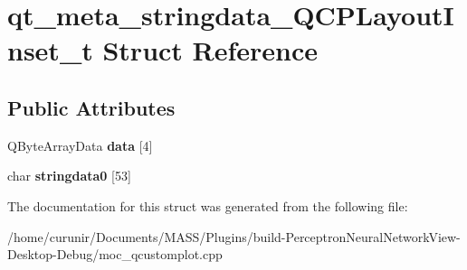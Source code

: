 \hypertarget{structqt__meta__stringdata___q_c_p_layout_inset__t}{}\section{qt\+\_\+meta\+\_\+stringdata\+\_\+\+Q\+C\+P\+Layout\+Inset\+\_\+t Struct Reference}
\label{structqt__meta__stringdata___q_c_p_layout_inset__t}
\subsection*{Public Attributes}
\begin{DoxyCompactItemize}
\item 
Q\+Byte\+Array\+Data {\bfseries data} \mbox{[}4\mbox{]}\hypertarget{structqt__meta__stringdata___q_c_p_layout_inset__t_ae85a598291582d31cc12989c0279ea44}{}\label{structqt__meta__stringdata___q_c_p_layout_inset__t_ae85a598291582d31cc12989c0279ea44}

\item 
char {\bfseries stringdata0} \mbox{[}53\mbox{]}\hypertarget{structqt__meta__stringdata___q_c_p_layout_inset__t_a7cc558fa6388df25517a33006f4a76a2}{}\label{structqt__meta__stringdata___q_c_p_layout_inset__t_a7cc558fa6388df25517a33006f4a76a2}

\end{DoxyCompactItemize}


The documentation for this struct was generated from the following file\+:\begin{DoxyCompactItemize}
\item 
/home/curunir/\+Documents/\+M\+A\+S\+S/\+Plugins/build-\/\+Perceptron\+Neural\+Network\+View-\/\+Desktop-\/\+Debug/moc\+\_\+qcustomplot.\+cpp\end{DoxyCompactItemize}
